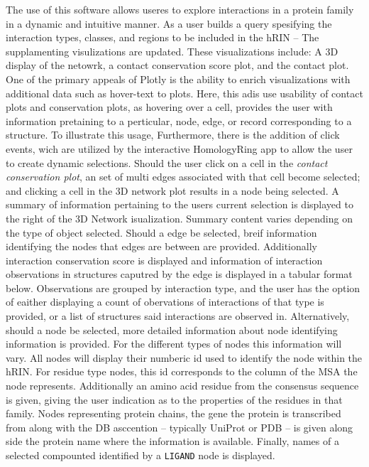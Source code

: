 The use of this software allows useres to explore interactions in a protein family in a dynamic and intuitive manner. As a user builds a query spesifying the interaction types, classes, and regions to be included in the hRIN -- The supplamenting visulizations are updated. 
These visualizations include: A 3D display of the netowrk, a contact conservation score plot, and the contact plot.
One of the primary appeals of Plotly is the ability to enrich visualizations with additional data such as hover-text to plots. Here, this adis use usability of contact plots and conservation plots, as hovering over a cell, provides the user with information pretaining to a perticular, node, edge, or record corresponding to a structure. 
To illustrate this usage, 
Furthermore, there is the addition of click events, wich are utilized by the interactive HomologyRing app to allow the user to create dynamic selections. Should the user click on a cell in the \emph{contact conservation plot}, an set of multi edges associated with that cell become selected; and clicking a cell in the 3D network plot results in a node being selected. 
A summary of information pertaining to the users current selection is displayed to the right of the 3D Network isualization. Summary content varies depending on the type of object selected. Should a edge be selected, breif information identifying the nodes that edges are between are provided. Additionally interaction conservation score is displayed and information of interaction observations in structures caputred by the edge is displayed in a tabular format below. Observations are grouped by interaction type, and the user has the option of eaither displaying a count of obervations of interactions of that type is provided, or a list of structures said interactions are observed in. Alternatively, should a node be selected, more detailed information about node identifying information is provided. For the different types of nodes this information will vary. %
All nodes will display their numberic id used to identify the node within the hRIN. For residue type nodes, this id corresponds to the column of the MSA the node represents. Additionally an amino acid residue from the consensus sequence is given, giving the user indication as to the properties of the residues in that family. 
Nodes representing protein chains, the gene the protein is transcribed from along with the DB asccention -- typically UniProt or PDB -- is given along side the protein name where the information is available. 
Finally, names of a selected compounted identified by a \texttt{LIGAND} node is displayed.

